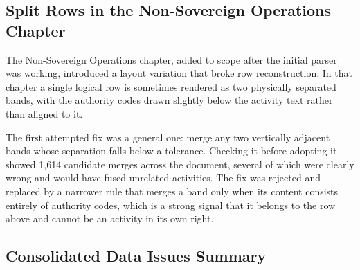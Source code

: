 \subsection{Split Rows in the Non-Sovereign Operations Chapter}
\label{sec:splitrows}

The Non-Sovereign Operations chapter, added to scope after the initial parser was working, introduced a layout variation that broke row reconstruction. In that chapter a single logical row is sometimes rendered as two physically separated bands, with the authority codes drawn slightly below the activity text rather than aligned to it.

The first attempted fix was a general one: merge any two vertically adjacent bands whose separation falls below a tolerance. Checking it before adopting it showed 1,614 candidate merges across the document, several of which were clearly wrong and would have fused unrelated activities. The fix was rejected and replaced by a narrower rule that merges a band only when its content consists entirely of authority codes, which is a strong signal that it belongs to the row above and cannot be an activity in its own right.

\subsection{Consolidated Data Issues Summary}

